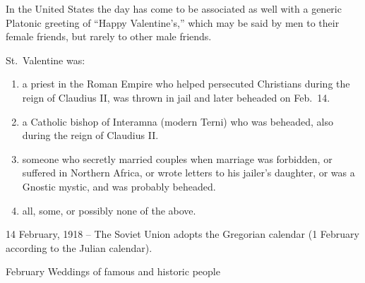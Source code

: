 \documentclass[12pt]{article}
\begin{document}
In the United States the day has come to be associated as well with a generic Platonic greeting of ``Happy Valentine's,'' which may be said by men to their female friends, but rarely to other male friends.

St.\ Valentine was:

\vspace{-0.75 cm}
\begin{enumerate}\renewcommand{\labelenumi}{\Alph{enumi}.}\setlength{\itemsep}{-0.05 cm}
  \item a priest in the Roman Empire who helped persecuted Christians during the reign of Claudius II, was thrown in jail and later beheaded on Feb.\ 14.
  \item a Catholic bishop of Interamna (modern Terni) who was beheaded, also during the reign of Claudius II.
  \item someone who secretly married couples when marriage was forbidden, or suffered in Northern Africa, or wrote letters to his jailer's daughter, or was a Gnostic mystic, and was probably beheaded.
  \item all, some, or possibly none of the above.
\end{enumerate}

14 February, 1918 -- The Soviet Union adopts the Gregorian calendar (1 February according to the Julian calendar).

\pagebreak

February Weddings of famous and historic people
\end{document}
